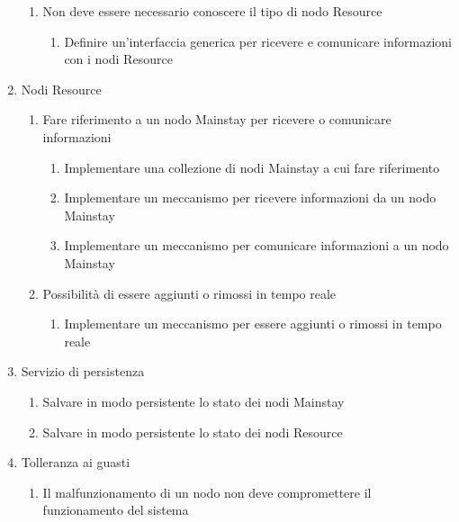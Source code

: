 \begin{enumerate}
\begin{enumerate}
              \item Non deve essere necessario conoscere il tipo di nodo Resource
                    \begin{enumerate}
                        \item Definire un'interfaccia generica per ricevere e comunicare informazioni con i nodi Resource
                    \end{enumerate}
          \end{enumerate}
    \item Nodi Resource
          \begin{enumerate}
              \item Fare riferimento a un nodo Mainstay per ricevere o comunicare informazioni
                    \begin{enumerate}
                        \item Implementare una collezione di nodi Mainstay a cui fare riferimento
                        \item Implementare un meccanismo per ricevere informazioni da un nodo Mainstay
                        \item Implementare un meccanismo per comunicare informazioni a un nodo Mainstay
                    \end{enumerate}
              \item Possibilità di essere aggiunti o rimossi in tempo reale
                    \begin{enumerate}
                        \item Implementare un meccanismo per essere aggiunti o rimossi in tempo reale
                    \end{enumerate}
          \end{enumerate}
    \item Servizio di persistenza
          \begin{enumerate}
              \item Salvare in modo persistente lo stato dei nodi Mainstay
              \item Salvare in modo persistente lo stato dei nodi Resource
          \end{enumerate}
    \item Tolleranza ai guasti
          \begin{enumerate}
              \item Il malfunzionamento di un nodo non deve compromettere il funzionamento del sistema
          \end{enumerate}

\end{enumerate}
